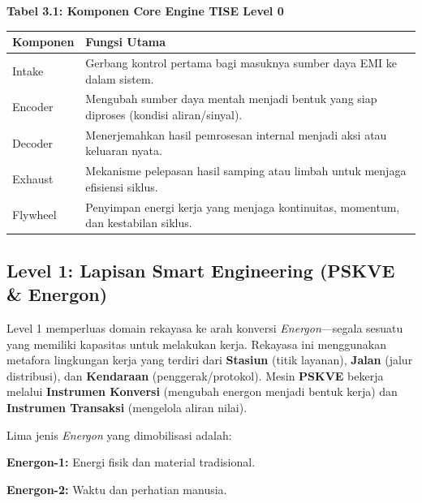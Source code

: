 \documentclass[
  letterpaper,
  DIV=11,
  numbers=noendperiod]{scrreprt}
\newcounter{none} %
\begin{document}
\textbf{Tabel 3.1: Komponen Core Engine TISE Level 0}

{\def\LTcaptype{none} %
\begin{longtable}[]{@{}
  >{\raggedright\arraybackslash}p{}
  >{\raggedright\arraybackslash}p{}@{}}
\toprule\noalign{}
\begin{minipage}[b]{\linewidth}\raggedright
Komponen
\end{minipage} & \begin{minipage}[b]{\linewidth}\raggedright
Fungsi Utama
\end{minipage} \\
\midrule\noalign{}
\endhead
\bottomrule\noalign{}
\endlastfoot
Intake & Gerbang kontrol pertama bagi masuknya sumber daya EMI ke dalam
sistem. \\
Encoder & Mengubah sumber daya mentah menjadi bentuk yang siap diproses
(kondisi aliran/sinyal). \\
Decoder & Menerjemahkan hasil pemrosesan internal menjadi aksi atau
keluaran nyata. \\
Exhaust & Mekanisme pelepasan hasil samping atau limbah untuk menjaga
efisiensi siklus. \\
Flywheel & Penyimpan energi kerja yang menjaga kontinuitas, momentum,
dan kestabilan siklus. \\
\end{longtable}
}

\subsection{Level 1: Lapisan Smart Engineering (PSKVE \&
Energon)}\label{level-1-lapisan-smart-engineering-pskve-energon}

Level 1 memperluas domain rekayasa ke arah konversi
\emph{Energon}---segala sesuatu yang memiliki kapasitas untuk melakukan
kerja. Rekayasa ini menggunakan metafora lingkungan kerja yang terdiri
dari \textbf{Stasiun} (titik layanan), \textbf{Jalan} (jalur
distribusi), dan \textbf{Kendaraan} (penggerak/protokol). Mesin
\textbf{PSKVE} bekerja melalui \textbf{Instrumen Konversi} (mengubah
energon menjadi bentuk kerja) dan \textbf{Instrumen Transaksi}
(mengelola aliran nilai).

Lima jenis \emph{Energon} yang dimobilisasi adalah:

\textbf{Energon-1:} Energi fisik dan material tradisional.

\textbf{Energon-2:} Waktu dan perhatian manusia.
\end{document}
